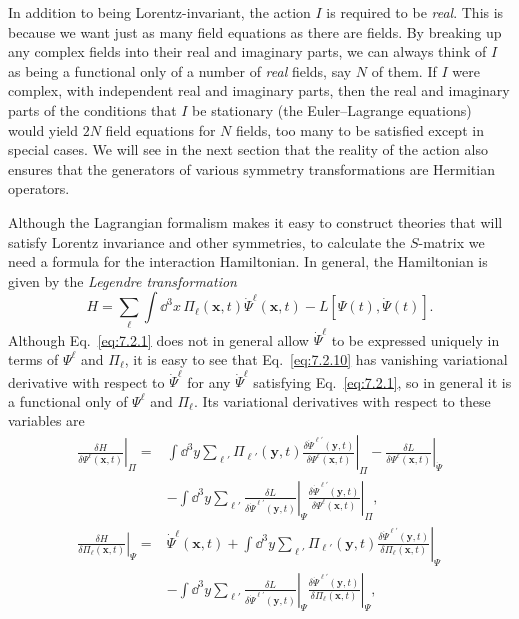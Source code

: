 In addition to being Lorentz-invariant, the action $I$ is required to be
\textit{real}. This is because we want just as many field equations as there are
fields. By breaking up any complex fields into their real and imaginary
parts, we can always think of $I$ as being a functional only of a number
of \textit{real} fields, say $N$ of them. If $I$ were complex, with independent real
and imaginary parts, then the real and imaginary parts of the conditions
that $I$ be stationary (the Euler--Lagrange equations) would yield $2N$ field
equations for $N$ fields, too many to be satisfied except in special cases.
We will see in the next section that the reality of the action also ensures
that the generators of various symmetry transformations are Hermitian
operators.

Although the Lagrangian formalism makes it easy to construct theories
that will satisfy Lorentz invariance and other symmetries, to calculate the
$S$-matrix we need a formula for the interaction Hamiltonian. In general,
the Hamiltonian is given by the \textit{Legendre transformation}
\begin{equation}
H=\sum_\ell\int \dd^3x\,
\Pi_\ell(\mathbf{x},t)\dot\Psi^\ell(\mathbf{x},t)-L[\Psi(t),\dot\Psi(t)].
\tag{7.2.10}\label{eq:7.2.10}
\end{equation}
Although Eq.~\eqref{eq:7.2.1} does not in general allow $\dot\Psi^\ell$ to be expressed uniquely
in terms of $\Psi^\ell$ and $\Pi_\ell$, it is easy to see that Eq.~\eqref{eq:7.2.10} has vanishing
variational derivative with respect to $\dot\Psi^\ell$ for any $\dot\Psi^\ell$ satisfying
Eq.~\eqref{eq:7.2.1}, so in general it is a functional only of $\Psi^\ell$ and $\Pi_\ell$.
Its variational derivatives with respect to these variables are
\begin{align*}
\left.\frac{\delta H}{\delta\Psi^\ell(\mathbf{x},t)}\right|_{\Pi}
={}&\int \dd^3y\sum_{\ell'}\Pi_{\ell'}(\mathbf{y},t)
\left.\frac{\delta\dot\Psi^{\ell'}(\mathbf{y},t)}
{\delta\Psi^\ell(\mathbf{x},t)}\right|_{\Pi}
-\left.\frac{\delta L}{\delta\Psi^\ell(\mathbf{x},t)}\right|_{\dot\Psi}
\\
&-\int \dd^3y\sum_{\ell'}
\left.\frac{\delta L}{\delta\dot\Psi^{\ell'}(\mathbf{y},t)}\right|_{\Psi}
\left.\frac{\delta\dot\Psi^{\ell'}(\mathbf{y},t)}
{\delta\Psi^\ell(\mathbf{x},t)}\right|_{\Pi},
\\[3pt]
\left.\frac{\delta H}{\delta\Pi_\ell(\mathbf{x},t)}\right|_{\Psi}
={}&\dot\Psi^\ell(\mathbf{x},t)
+\int \dd^3y\sum_{\ell'}\Pi_{\ell'}(\mathbf{y},t)
\left.\frac{\delta\dot\Psi^{\ell'}(\mathbf{y},t)}
{\delta\Pi_\ell(\mathbf{x},t)}\right|_{\Psi}
\\
&-\int \dd^3y\sum_{\ell'}
\left.\frac{\delta L}{\delta\dot\Psi^{\ell'}(\mathbf{y},t)}\right|_{\Psi}
\left.\frac{\delta\dot\Psi^{\ell'}(\mathbf{y},t)}
{\delta\Pi_\ell(\mathbf{x},t)}\right|_{\Psi},
\end{align*}
